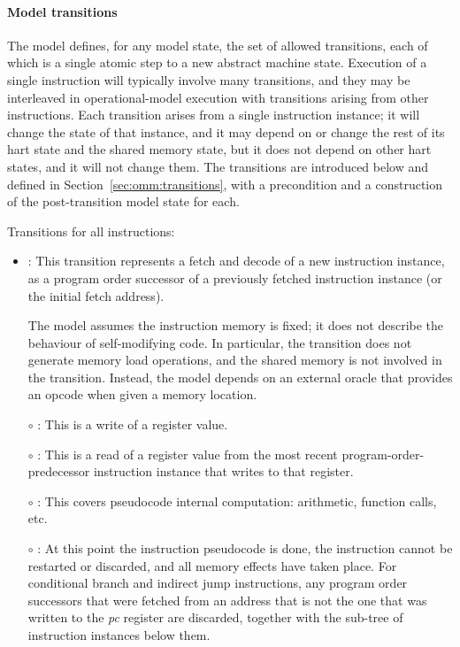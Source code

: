 \paragraph{Model transitions}
The model defines, for any model state, the set of allowed transitions, each of which is a single atomic step to a new abstract machine state.
Execution of a single instruction will typically involve many
transitions, and they may be interleaved in operational-model
execution with transitions arising from other instructions. 
Each transition arises from a single instruction instance; it will
change the state of that instance, and it may depend on or change the
rest of its hart state and the shared memory state, but it does not depend on other hart states, and it will not change them.
The transitions are introduced below and defined in Section~\ref{sec:omm:transitions}, with a precondition and a construction of the post-transition model state for each.

\noindent Transitions for all instructions:
\begin{itemize}
\item {}: This transition represents a fetch and
  decode of a new instruction instance, as a program order successor
  of a previously fetched instruction instance (or the initial fetch
  address).

The model assumes the instruction memory is fixed; it does not
describe the behaviour of self-modifying code. 
In particular, the  transition does not generate memory load operations, and the shared memory is not involved in the transition.
Instead, the model depends on an external oracle that provides an opcode when given a memory location.
%


\item[$\circ$] : This is a write of a register value.
\item[$\circ$] : This is a read of a register
  value from the most recent program-order-predecessor instruction instance that writes to that register.
\item[$\circ$] : This covers pseudocode
  internal computation: arithmetic, function calls, etc.
\item[$\circ$] : At this point the instruction pseudocode is done, the instruction cannot be restarted or discarded, and all memory effects have taken place.
For conditional branch and indirect jump instructions, any program order successors that were fetched from an address that is not the one that was written to the {\em pc} register are discarded, together with the sub-tree of instruction instances below them.
\end{itemize}

